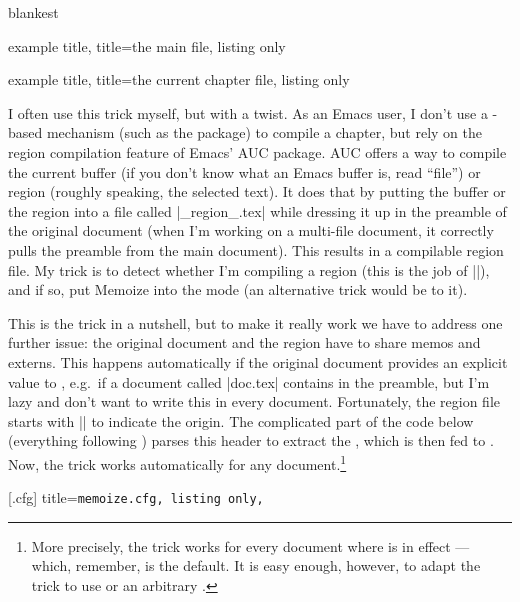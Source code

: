 \documentclass[a4paper,11pt]{article}
\begin{document}
\begin{tcboxedraster}[raster columns=2, raster valign=top]{blankest}
  \begin{tcblisting}{example title, title=the main file, listing only}

  \end{tcblisting}
  \begin{tcblisting}{example title, title=the current chapter file, listing only}
  \end{tcblisting}
\end{tcboxedraster}

\begin{tcolorbox}[title=For {\hypercolor{url}{white}\Emacs} users]
  I often use this  trick myself, but with a twist.  As an Emacs user,
  I don't use a -based mechanism (such as the  package) to
  compile a chapter, but rely on the region compilation feature of Emacs'
  AUC package.  AUC offers a way to compile the current
  buffer (if you don't know what an Emacs buffer is, read ``file'') or region
  (roughly speaking, the selected text).  It does that by putting the buffer or
  the region into a file called |_region_.tex| while dressing it up in the
  preamble of the original document (when I'm working on a multi-file document,
  it correctly pulls the preamble from the main document).  This results in a
  compilable region file.  My trick is to detect whether I'm compiling a region
  (this is the job of |\ifregion|), and if so, put Memoize into the 
  mode (an alternative trick would be to  it).

  This is the trick in a nutshell, but to make it really work we have to
  address one further issue: the original document and the region have to share
  memos and externs.  This happens automatically if the original document
  provides an explicit value to , e.g.\ if a document called
  |doc.tex| contains  in the preamble, but I'm lazy
  and don't want to write this in every document.  Fortunately, the region file
  starts with || to
  indicate the origin.  The complicated part of the code below (everything
  following ) parses this header to
  extract the , which is then fed to .  Now, the trick works automatically for any document.\footnote{More
    precisely, the trick works for every document where  is in
    effect --- which, remember, is the default.  It is easy enough, however, to
    adapt the trick to use  or an arbitrary
    .}

  [.cfg]{
    title=\tt memoize.cfg,
    listing only,
  }
\end{tcolorbox}
\end{document}
